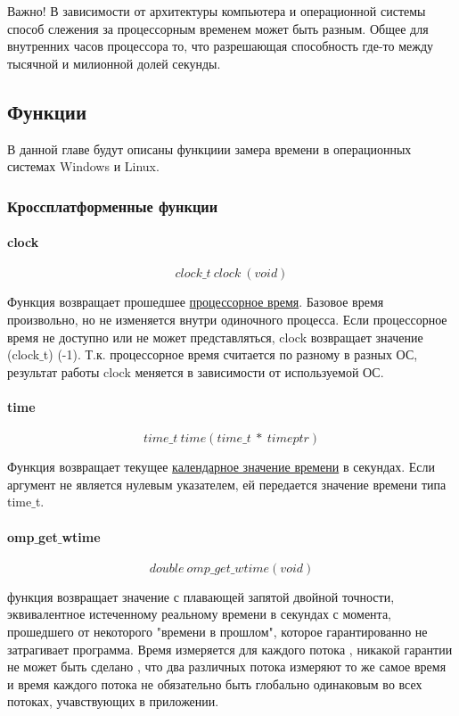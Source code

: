 \documentclass{article}
\begin{document}
				Важно! В зависимости от архитектуры компьютера и операционной системы способ слежения за процессорным временем 					может быть разным. Общее для внутренних часов процессора то, что разрешающая способность где-то между тысячной и 					милионной долей секунды.
		
		\subsection{Функции}
		В данной главе будут описаны функциии замера времени в операционных системах Windows и Linux. 
		\subsubsection{Кроссплатформенные функции}
			\paragraph{clock}
				$$clock\_t~clock~(void)$$
				
				Функция возвращает прошедшее \underline{процессорное время}. Базовое время произвольно, но не изменяется внутри 				одиночного процесса. Если процессорное время не доступно или не может представляться, clock возвращает значение 					(clock$\_$t) (-1). Т.к. процессорное время считается по разному в разных ОС, результат работы clock меняется в 						зависимости от используемой ОС.
		\newpage			
			\paragraph*{time}
				$$time\_t~time(time\_t~ *~ timeptr)$$
				
				Функция возвращает текущее \underline{календарное значение времени} в секундах. Если аргумент не является нулевым 			указателем, ей передается значение времени типа time$\_$t.
				
				
			\paragraph*{omp$\_$get$\_$wtime}
			$$double~omp\_get\_wtime(void)$$
				
				функция возвращает значение с плавающей запятой двойной точности, эквивалентное истеченному реальному времени в 				секундах с момента, прошедшего от некоторого "времени в прошлом", которое гарантированно не затрагивает 							программа. Время измеряется для каждого потока , никакой гарантии не может быть сделано , что два различных 						потока	измеряют то же самое время и время каждого потока не обязательно быть глобально одинаковым во всех 							потоках, учавствующих в приложении.	
							
\end{document}
